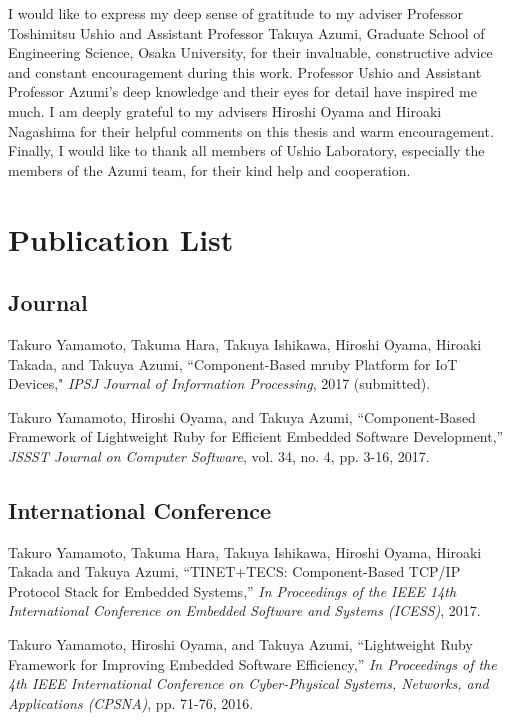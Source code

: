 \documentclass[a4j,12pt,oneside,openany,english]{jsbook}
\begin{document}
\begin{acknowledgment}
I would like to express my deep sense of gratitude to my adviser Professor Toshimitsu Ushio and Assistant Professor Takuya Azumi, Graduate School of Engineering Science, Osaka University, for their invaluable, constructive advice and constant encouragement during this work.
Professor Ushio and Assistant Professor Azumi's deep knowledge and their eyes for detail have inspired me much.
I am deeply grateful to my advisers Hiroshi Oyama and Hiroaki Nagashima for their helpful comments on this thesis and warm encouragement.
Finally, I would like to thank all members of Ushio Laboratory, especially the members of the Azumi team, for their kind help and cooperation.
\end{acknowledgment}





\chapter*{Publication List}
\section*{Journal}
\begin{enumerate}[{[}1{]}]
\item
    Takuro Yamamoto, Takuma Hara, Takuya Ishikawa, Hiroshi Oyama, Hiroaki Takada, and Takuya Azumi,
    ``Component-Based mruby Platform for IoT Devices,"
    \emph{IPSJ Journal of Information Processing},
    2017 (submitted).
\item
    Takuro Yamamoto, Hiroshi Oyama, and Takuya Azumi,
    ``Component-Based Framework of Lightweight Ruby for Efficient Embedded Software Development,''
    \emph{JSSST Journal on Computer Software},
    vol. 34, no. 4, pp. 3-16, 2017.
\end{enumerate}

\section*{International Conference}
\begin{enumerate}[{[}1{]}]
\item
    Takuro Yamamoto, Takuma Hara, Takuya Ishikawa, Hiroshi Oyama, Hiroaki Takada and Takuya Azumi,
    ``TINET+TECS: Component-Based TCP/IP Protocol Stack for Embedded Systems,''
    \emph{In Proceedings of the IEEE 14th International Conference on Embedded Software and Systems (ICESS)},
    2017.
\item
    Takuro Yamamoto, Hiroshi Oyama, and Takuya Azumi,
    ``Lightweight Ruby Framework for Improving Embedded Software Efficiency,''
    \emph{In Proceedings of the 4th IEEE International Conference on Cyber-Physical Systems, Networks, and Applications (CPSNA)},
    pp. 71-76, 2016.
\end{enumerate}
\end{document}

